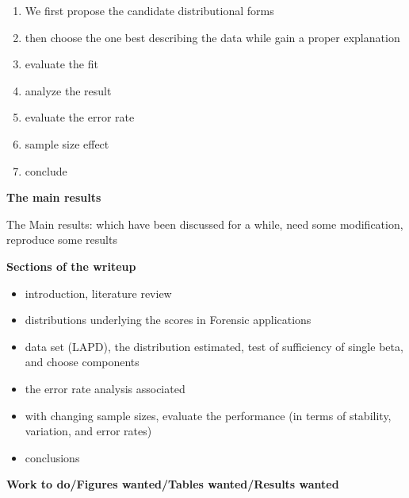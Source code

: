 \documentclass[12pt]{article}         %
\begin{document}
\begin{enumerate}
\item We first propose the candidate distributional forms
\item then choose the one best describing the data while gain a proper explanation
\item evaluate the fit
\item analyze the result
\item evaluate the error rate
\item sample size effect
\item conclude
\end{enumerate}

\textbf {The main results}

\bigskip

The Main results: which have been discussed for a while, need some modification, reproduce some results

\bigskip

\textbf {Sections of the writeup}

\begin{itemize}
  \item introduction, literature review
  \item distributions underlying the scores in Forensic applications
  \item data set (LAPD), the distribution estimated, test of sufficiency of single beta, and choose components
  \item the error rate analysis associated
  \item with changing sample sizes, evaluate the performance (in terms of stability, variation, and error rates)
  \item conclusions
\end{itemize}

\textbf {Work to do/Figures wanted/Tables wanted/Results wanted}
\end{document}
